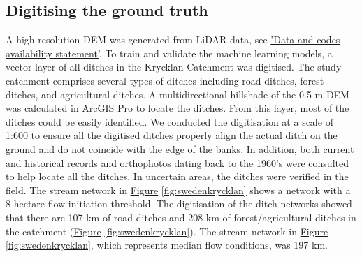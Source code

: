 \documentclass[]{interact}
\theoremstyle{plain}%
\theoremstyle{definition}
\theoremstyle{remark}
\begin{document}
\subsection{Digitising the ground truth}
A high resolution DEM was generated from LiDAR data, see \hyperref[lidartodem]{'Data and codes availability statement'}. To train and validate the machine learning models, a vector layer of all ditches in the Krycklan Catchment \citep{krycklancatchment} was digitised. The study catchment comprises several types of ditches including road ditches, forest ditches, and agricultural ditches. A multidirectional hillshade of the 0.5 m DEM was calculated in ArcGIS Pro to locate the ditches. From this layer, most of the ditches could be easily identified. We conducted the digitisation at a scale of 1:600 to ensure all the digitised ditches properly align the actual ditch on the ground and do not coincide with the edge of the banks. In addition, both current and historical records and orthophotos dating back to the 1960's were consulted to help locate all the ditches. In uncertain areas, the ditches were verified in the field. The stream network in \hyperref[fig:swedenkrycklan]{Figure} \ref{fig:swedenkrycklan} shows a network with a 8 hectare flow initiation threshold. The digitisation of the ditch networks showed that there are 107 km of road ditches and 208 km of forest/agricultural ditches in the catchment (\hyperref[fig:swedenkrycklan]{Figure} \ref{fig:swedenkrycklan}). The stream network in \hyperref[fig:swedenkrycklan]{Figure} \ref{fig:swedenkrycklan}, which represents median flow conditions, was 197 km.
\end{document}
